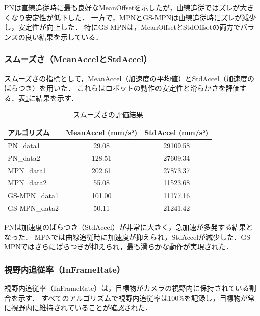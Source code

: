PNは直線追従時に最も良好なMeanOffsetを示したが，曲線追従ではズレが大きくなり安定性が低下した．
一方で，MPNとGS-MPNは曲線追従時にズレが減少し，安定性が向上した．
特にGS-MPNは，MeanOffsetとStdOffsetの両方でバランスの良い結果を示している．

\subsubsection{スムーズさ（MeanAccelとStdAccel）}
スムーズさの指標として，MeanAccel（加速度の平均値）とStdAccel（加速度のばらつき）を用いた．
これらはロボットの動作の安定性と滑らかさを評価する．表\ref{tab:accel_results}に結果を示す．

\begin{table}[H]
    \centering
    \caption{スムーズさの評価結果}
    \label{tab:accel_results}
    \begin{tabular}{|l|c|c|}
        \hline
        \textbf{アルゴリズム} & \textbf{MeanAccel (mm/s²)} & \textbf{StdAccel (mm/s²)} \\ \hline
        PN\_data1             & 29.08                      & 29109.58                  \\ \hline
        PN\_data2             & 128.51                     & 27609.34                  \\ \hline
        MPN\_data1            & 202.61                     & 27873.37                  \\ \hline
        MPN\_data2            & 55.08                      & 11523.68                  \\ \hline
        GS-MPN\_data1         & 101.00                     & 11177.16                  \\ \hline
        GS-MPN\_data2         & 50.11                      & 21241.42                  \\ \hline
    \end{tabular}
\end{table}

PNは加速度のばらつき（StdAccel）が非常に大きく，急加速が多発する結果となった．
MPNでは曲線追従時に加速度が抑えられ，StdAccelが減少した．GS-MPNではさらにばらつきが抑えられ，最も滑らかな動作が実現された．

\subsubsection{視野内追従率（InFrameRate）}
視野内追従率（InFrameRate）は，目標物がカメラの視野内に保持されている割合を示す．
すべてのアルゴリズムで視野内追従率は100\%を記録し，目標物が常に視野内に維持されていることが確認された．

